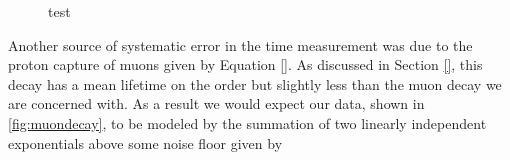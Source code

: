 \begin{figure}[h]
\begin{center}
\hspace{-7mm}
\vspace{-2mm}
\vspace{-2mm}
\vspace{-2mm}
\caption{test}
\label{fig:autocorr}
\end{center}
\end{figure}

Another source of systematic error in the time measurement was due to the proton capture of muons given by Equation \eqref{}.  As discussed in Section \ref{}, this decay has a mean lifetime on the order but slightly less than the muon decay we are concerned with.  As a result we would expect our data, shown in \ref{fig:muondecay}, to be modeled by the summation of two linearly independent exponentials above some noise floor given by

